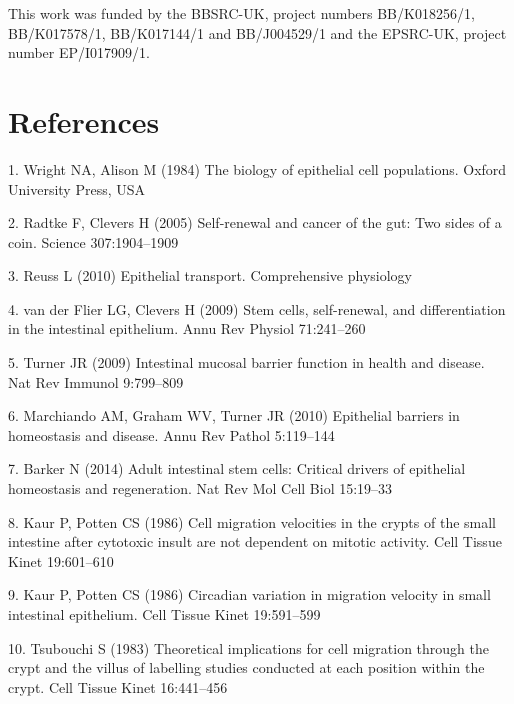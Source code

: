 \documentclass[10pt,letterpaper]{article}
\begin{document}
This work was funded by the BBSRC-UK, project numbers BB/K018256/1,
BB/K017578/1, BB/K017144/1 and BB/J004529/1 and the EPSRC-UK, project
number EP/I017909/1.

\nolinenumbers

\section*{References}\label{references}

\hypertarget{refs}{}
\hypertarget{ref-Wright1984-kw}{}
1. Wright NA, Alison M (1984) The biology of epithelial cell
populations. Oxford University Press, USA

\hypertarget{ref-Radtke2005-dh}{}
2. Radtke F, Clevers H (2005) Self-renewal and cancer of the gut: Two
sides of a coin. Science 307:1904--1909

\hypertarget{ref-Reuss2010-fn}{}
3. Reuss L (2010) Epithelial transport. Comprehensive physiology

\hypertarget{ref-Van_der_Flier2009-hw}{}
4. van der Flier LG, Clevers H (2009) Stem cells, self-renewal, and
differentiation in the intestinal epithelium. Annu Rev Physiol
71:241--260

\hypertarget{ref-Turner2009-ei}{}
5. Turner JR (2009) Intestinal mucosal barrier function in health and
disease. Nat Rev Immunol 9:799--809

\hypertarget{ref-Marchiando2010-th}{}
6. Marchiando AM, Graham WV, Turner JR (2010) Epithelial barriers in
homeostasis and disease. Annu Rev Pathol 5:119--144

\hypertarget{ref-Barker2014-xu}{}
7. Barker N (2014) Adult intestinal stem cells: Critical drivers of
epithelial homeostasis and regeneration. Nat Rev Mol Cell Biol 15:19--33

\hypertarget{ref-Kaur1986-xq}{}
8. Kaur P, Potten CS (1986) Cell migration velocities in the crypts of
the small intestine after cytotoxic insult are not dependent on mitotic
activity. Cell Tissue Kinet 19:601--610

\hypertarget{ref-Kaur1986-je}{}
9. Kaur P, Potten CS (1986) Circadian variation in migration velocity in
small intestinal epithelium. Cell Tissue Kinet 19:591--599

\hypertarget{ref-Tsubouchi1983-tk}{}
10. Tsubouchi S (1983) Theoretical implications for cell migration
through the crypt and the villus of labelling studies conducted at each
position within the crypt. Cell Tissue Kinet 16:441--456
\end{document}
